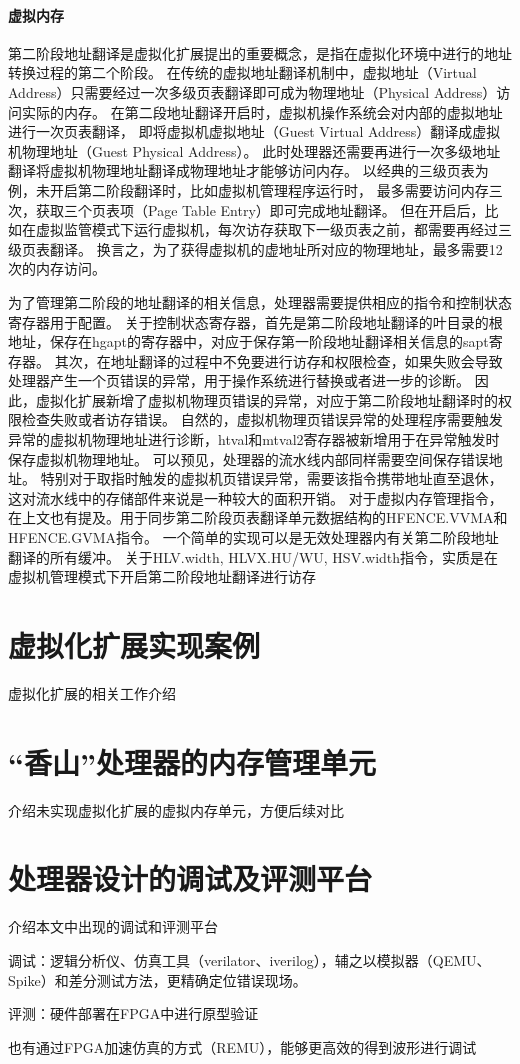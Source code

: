 \paragraph{虚拟内存}
第二阶段地址翻译是虚拟化扩展提出的重要概念，是指在虚拟化环境中进行的地址转换过程的第二个阶段。
在传统的虚拟地址翻译机制中，虚拟地址（Virtual Address）只需要经过一次多级页表翻译即可成为物理地址（Physical Address）访问实际的内存。
在第二段地址翻译开启时，虚拟机操作系统会对内部的虚拟地址进行一次页表翻译，
即将虚拟机虚拟地址（Guest Virtual Address）翻译成虚拟机物理地址（Guest Physical Address）。
此时处理器还需要再进行一次多级地址翻译将虚拟机物理地址翻译成物理地址才能够访问内存。
以经典的三级页表为例，未开启第二阶段翻译时，比如虚拟机管理程序运行时，
最多需要访问内存三次，获取三个页表项（Page Table Entry）即可完成地址翻译。
但在开启后，比如在虚拟监管模式下运行虚拟机，每次访存获取下一级页表之前，都需要再经过三级页表翻译。
换言之，为了获得虚拟机的虚地址所对应的物理地址，最多需要12次的内存访问。

为了管理第二阶段的地址翻译的相关信息，处理器需要提供相应的指令和控制状态寄存器用于配置。
关于控制状态寄存器，首先是第二阶段地址翻译的叶目录的根地址，保存在hgapt的寄存器中，对应于保存第一阶段地址翻译相关信息的sapt寄存器。
其次，在地址翻译的过程中不免要进行访存和权限检查，如果失败会导致处理器产生一个页错误的异常，用于操作系统进行替换或者进一步的诊断。
因此，虚拟化扩展新增了虚拟机物理页错误的异常，对应于第二阶段地址翻译时的权限检查失败或者访存错误。
自然的，虚拟机物理页错误异常的处理程序需要触发异常的虚拟机物理地址进行诊断，htval和mtval2寄存器被新增用于在异常触发时保存虚拟机物理地址。
可以预见，处理器的流水线内部同样需要空间保存错误地址。
特别对于取指时触发的虚拟机页错误异常，需要该指令携带地址直至退休，这对流水线中的存储部件来说是一种较大的面积开销。
对于虚拟内存管理指令，在上文也有提及。用于同步第二阶段页表翻译单元数据结构的HFENCE.VVMA和HFENCE.GVMA指令。
一个简单的实现可以是无效处理器内有关第二阶段地址翻译的所有缓冲。
关于HLV.width, HLVX.HU/WU, HSV.width指令，实质是在虚拟机管理模式下开启第二阶段地址翻译进行访存

\section{虚拟化扩展实现案例}
虚拟化扩展的相关工作介绍

\section{“香山”处理器的内存管理单元}
介绍未实现虚拟化扩展的虚拟内存单元，方便后续对比

\section{处理器设计的调试及评测平台}
介绍本文中出现的调试和评测平台

调试：逻辑分析仪、仿真工具（verilator、iverilog），辅之以模拟器（QEMU、Spike）和差分测试方法，更精确定位错误现场。

评测：硬件部署在FPGA中进行原型验证

也有通过FPGA加速仿真的方式（REMU），能够更高效的得到波形进行调试